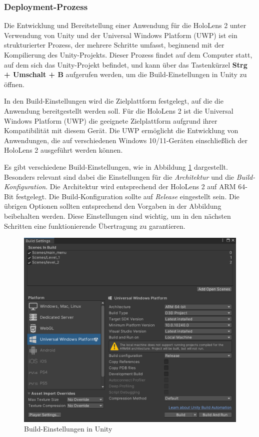 \subsubsection{Deployment-Prozess}

Die Entwicklung und Bereitstellung einer Anwendung für die HoloLens 2 unter Verwendung von Unity und der Universal Windows Platform (UWP) ist ein strukturierter Prozess, der mehrere Schritte umfasst, beginnend mit der Kompilierung des Unity-Projekts. Dieser Prozess findet auf dem Computer statt, auf dem sich das Unity-Projekt befindet, und kann über das Tastenkürzel \textbf{Strg + Umschalt + B} aufgerufen werden, um die Build-Einstellungen in Unity zu öffnen.

In den Build-Einstellungen wird die Zielplattform festgelegt, auf die die Anwendung bereitgestellt werden soll. Für die HoloLens 2 ist die Universal Windows Platform (UWP) die geeignete Zielplattform aufgrund ihrer Kompatibilität mit diesem Gerät. Die UWP ermöglicht die Entwicklung von Anwendungen, die auf verschiedenen Windows 10/11-Geräten einschließlich der HoloLens 2 ausgeführt werden können.

Es gibt verschiedene Build-Einstellungen, wie in Abbildung \ref{fig:build-settings} dargestellt. Besonders relevant sind dabei die Einstellungen für die \textit{Architektur} und die \textit{Build-Konfiguration}. Die Architektur wird entsprechend der HoloLens 2 auf ARM 64-Bit festgelegt. Die Build-Konfiguration sollte auf \textit{Release} eingestellt sein. Die übrigen Optionen sollten entsprechend den Vorgaben in der Abbildung beibehalten werden. Diese Einstellungen sind wichtig, um in den nächsten Schritten eine funktionierende Übertragung zu garantieren.

\begin{figure}[H]
    \centering
    \includegraphics[scale=0.6]{images/build}
    \caption{Build-Einstellungen in Unity}
    \label{fig:build-settings}
\end{figure}

